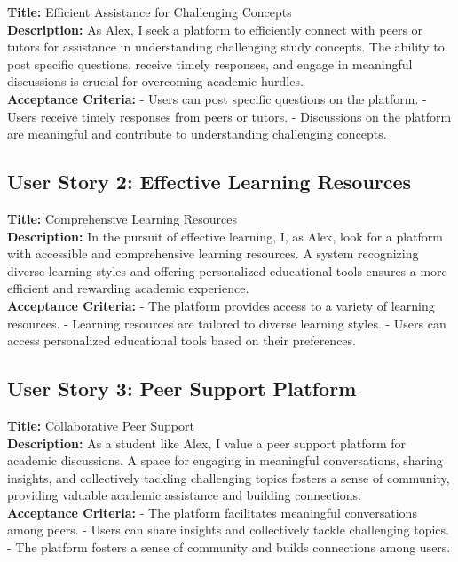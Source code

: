 \textbf{Title:} Efficient Assistance for Challenging Concepts \\
\textbf{Description:} As Alex, I seek a platform to efficiently connect with peers or tutors for assistance in understanding challenging study concepts. The ability to post specific questions, receive timely responses, and engage in meaningful discussions is crucial for overcoming academic hurdles. \\
\textbf{Acceptance Criteria:} 
- Users can post specific questions on the platform.
- Users receive timely responses from peers or tutors.
- Discussions on the platform are meaningful and contribute to understanding challenging concepts.

\subsection{User Story 2: Effective Learning Resources}

\textbf{Title:} Comprehensive Learning Resources \\
\textbf{Description:} In the pursuit of effective learning, I, as Alex, look for a platform with accessible and comprehensive learning resources. A system recognizing diverse learning styles and offering personalized educational tools ensures a more efficient and rewarding academic experience. \\
\textbf{Acceptance Criteria:} 
- The platform provides access to a variety of learning resources.
- Learning resources are tailored to diverse learning styles.
- Users can access personalized educational tools based on their preferences.

\subsection{User Story 3: Peer Support Platform}

\textbf{Title:} Collaborative Peer Support \\
\textbf{Description:} As a student like Alex, I value a peer support platform for academic discussions. A space for engaging in meaningful conversations, sharing insights, and collectively tackling challenging topics fosters a sense of community, providing valuable academic assistance and building connections. \\
\textbf{Acceptance Criteria:} 
- The platform facilitates meaningful conversations among peers.
- Users can share insights and collectively tackle challenging topics.
- The platform fosters a sense of community and builds connections among users.

